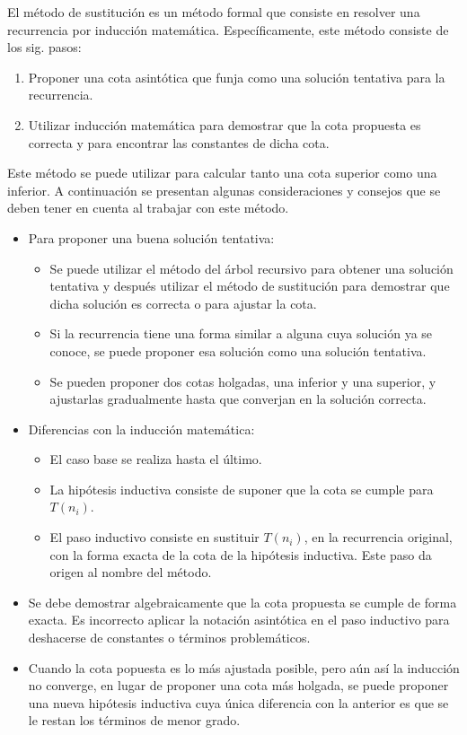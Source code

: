 El método de sustitución es un método formal que consiste en resolver
una recurrencia por inducción matemática. Específicamente, este método
consiste de los sig. pasos:
\begin{enumerate}
\item Proponer una cota asintótica que funja como una solución tentativa
para la recurrencia.
\item Utilizar inducción matemática para demostrar que la cota propuesta
es correcta y para encontrar las constantes de dicha cota.
\end{enumerate}
Este método se puede utilizar para calcular tanto una cota superior
como una inferior. A continuación se presentan algunas consideraciones
y consejos que se deben tener en cuenta al trabajar con este método. 
\begin{itemize}
\item Para proponer una buena solución tentativa:
\begin{itemize}
\item Se puede utilizar el método del árbol recursivo para obtener una solución
tentativa y después utilizar el método de sustitución para demostrar
que dicha solución es correcta o para ajustar la cota.
\item Si la recurrencia tiene una forma similar a alguna cuya solución ya
se conoce, se puede proponer esa solución como una solución tentativa.
\item Se pueden proponer dos cotas holgadas, una inferior y una superior,
y ajustarlas gradualmente hasta que converjan en la solución correcta. 
\end{itemize}
\item Diferencias con la inducción matemática:
\begin{itemize}
\item El caso base se realiza hasta el último.
\item La hipótesis inductiva consiste de suponer que la cota se cumple para
$T(n_{i})$.
\item El paso inductivo consiste en sustituir $T(n_{i})$, en la recurrencia
original, con la forma exacta de la cota de la hipótesis inductiva.
Este paso da origen al nombre del método.
\end{itemize}
\item Se debe demostrar algebraicamente que la cota propuesta se cumple
de forma exacta. Es incorrecto aplicar la notación asintótica en el
paso inductivo para deshacerse de constantes o términos problemáticos.
\item Cuando la cota popuesta es lo más ajustada posible, pero aún así la
inducción no converge, en lugar de proponer una cota más holgada,
se puede proponer una nueva hipótesis inductiva cuya única diferencia
con la anterior es que se le restan los términos de menor grado.
\end{itemize}

